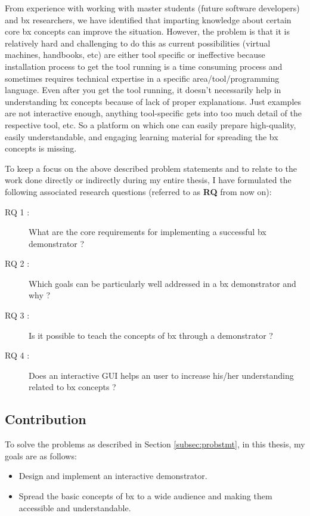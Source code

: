From experience with working with master students (future software developers) and bx researchers, we have identified that imparting knowledge about certain core bx concepts can improve the situation. However, the problem is that it is relatively hard and challenging to do this as current possibilities (virtual machines, handbooks, etc) are either tool specific or ineffective because installation process to get the tool running is a time consuming process and sometimes requires technical expertise in a specific area/tool/programming language. Even after you get the tool running, it doesn't necessarily help in understanding bx concepts because of lack of proper explanations. Just examples are not interactive enough, anything tool-specific gets into too much detail of the respective tool, etc.  So a platform on which one can easily prepare high-quality, easily understandable, and engaging learning material for spreading the bx concepts is missing.

To keep a focus on the above described problem statements and to relate to the work done directly or indirectly during my entire thesis, I have formulated the following associated research questions (referred to as \textbf{RQ} from now on):

\begin{description}
	\item [RQ 1 :] What are the core requirements for implementing a successful bx demonstrator ?
	\item [RQ 2 :] Which goals can be particularly well addressed in a bx demonstrator and why ?
	\item [RQ 3 :] Is it possible to teach the concepts of bx through a demonstrator ?
	\item [RQ 4 :] Does an interactive GUI helps an user to increase his/her understanding related to bx concepts ?
\end{description}

\subsection{Contribution}\label{subsec:contribution}
To solve the problems as described in Section \ref{subsec:probstmt}, in this thesis, my goals are as follows:
\begin{itemize} 
\item {Design and implement an interactive demonstrator.} 
\item {Spread the basic concepts of bx to a wide audience and making them accessible and understandable.}
\end{itemize}

